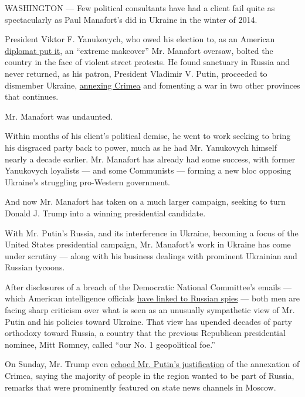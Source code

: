 WASHINGTON --- Few political consultants have had a client fail quite as
spectacularly as Paul Manafort's did in Ukraine in the winter of 2014.

President Viktor F. Yanukovych, who owed his election to, as an American
\href{https://wikileaks.org/plusd/cables/06KIEV473_a.html}{diplomat put
it}, an ``extreme makeover'' Mr. Manafort oversaw, bolted the country in
the face of violent street protests. He found sanctuary in Russia and
never returned, as his patron, President Vladimir V. Putin, proceeded to
dismember Ukraine,
\href{http://www.nytimes.com/2014/03/19/world/europe/ukraine.html}{annexing
Crimea} and fomenting a war in two other provinces that continues.

Mr. Manafort was undaunted.

Within months of his client's political demise, he went to work seeking
to bring his disgraced party back to power, much as he had Mr.
Yanukovych himself nearly a decade earlier. Mr. Manafort has already had
some success, with former Yanukovych loyalists --- and some Communists
--- forming a new bloc opposing Ukraine's struggling pro-Western
government.

And now Mr. Manafort has taken on a much larger campaign, seeking to
turn Donald J. Trump into a winning presidential candidate.

With Mr. Putin's Russia, and its interference in Ukraine, becoming a
focus of the United States presidential campaign, Mr. Manafort's work in
Ukraine has come under scrutiny --- along with his business dealings
with prominent Ukrainian and Russian tycoons.

After disclosures of a breach of the Democratic National Committee's
emails --- which American intelligence officials
\href{https://www.nytimes.com/2016/07/27/us/politics/spy-agency-consensus-grows-that-russia-hacked-dnc.html}{have
linked to Russian spies} --- both men are facing sharp criticism over
what is seen as an unusually sympathetic view of Mr. Putin and his
policies toward Ukraine. That view has upended decades of party
orthodoxy toward Russia, a country that the previous Republican
presidential nominee, Mitt Romney, called ``our No. 1 geopolitical
foe.''

On Sunday, Mr. Trump even
\href{https://www.nytimes.com/2016/08/01/world/europe/ukraine-trump-crimea-politics.html}{echoed
Mr. Putin's justification} of the annexation of Crimea, saying the
majority of people in the region wanted to be part of Russia, remarks
that were prominently featured on state news channels in Moscow.


